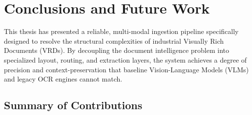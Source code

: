 \chapter{Conclusions and Future Work}
\label{ch:conclusion}

This thesis has presented a reliable, multi-modal ingestion pipeline specifically designed to resolve the structural complexities of industrial Visually Rich Documents (VRDs). By decoupling the document intelligence problem into specialized layout, routing, and extraction layers, the system achieves a degree of precision and context-preservation that baseline Vision-Language Models (VLMs) and legacy OCR engines cannot match.

\section{Summary of Contributions}
\label{sec:summary}

